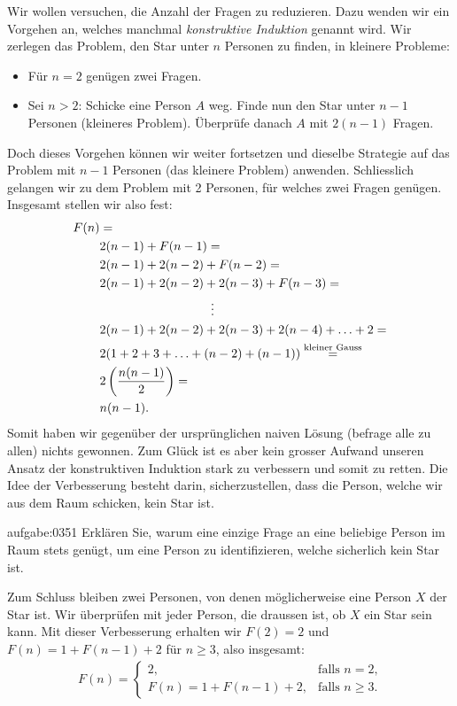 Wir wollen versuchen, die Anzahl der Fragen zu reduzieren. Dazu wenden wir ein Vorgehen an, welches manchmal \textit{konstruktive Induktion} genannt wird. Wir zerlegen das Problem, den Star unter $n$ Personen zu finden, in kleinere Probleme:
\begin{itemize}
    \item Für $n=2$ genügen zwei Fragen.
    \item Sei $n>2$: Schicke eine Person $A$ weg. Finde nun den Star unter $n-1$ Personen (kleineres Problem). Überprüfe danach $A$ mit $2(n-1)$ Fragen.
\end{itemize}
Doch dieses Vorgehen können wir weiter fortsetzen und dieselbe Strategie auf das Problem mit $n-1$ Personen (das kleinere Problem) anwenden. Schliesslich gelangen wir zu dem Problem mit 2 Personen, für welches zwei Fragen genügen. Insgesamt stellen wir also fest:
\begin{align*}
    F(n) &= \\
    &2(n-1) + F(n-1) =\\
    &2(n-1) + 2(n-2) + F(n-2) =\\
    &2(n-1) + 2(n-2) + 2(n-3) + F(n-3) =\\
    &\quad\quad\quad\quad\quad\quad\quad\quad\quad\vdots \\
    &2(n-1) + 2(n-2) + 2(n-3) + 2(n-4) + \ldots + 2 =\\
    &2(1 + 2 + 3 +\ldots + (n-2) + (n-1)) \stackrel{\text{kleiner Gauss}}{=} \\
    &2\left(\frac{n(n-1)}{2}\right) = \\
    &n(n-1).
\end{align*}
Somit haben wir gegenüber der ursprünglichen naiven Lösung (befrage alle zu allen) nichts gewonnen. Zum Glück ist es aber kein grosser Aufwand unseren Ansatz der konstruktiven Induktion stark zu verbessern und somit zu retten. Die Idee der Verbesserung besteht darin, sicherzustellen, dass die Person, welche wir aus dem Raum schicken, kein Star ist.
\begin{aufgabe}{aufgabe:0351}
Erklären Sie, warum eine einzige Frage an eine beliebige Person im Raum stets genügt, um eine Person zu identifizieren, welche sicherlich kein Star ist.
\end{aufgabe}
\noindent
Zum Schluss bleiben zwei Personen, von denen möglicherweise eine Person $X$ der Star ist. Wir überprüfen mit jeder Person, die draussen ist, ob $X$ ein Star sein kann. Mit dieser Verbesserung erhalten wir $F(2) = 2$ und $F(n) = 1 + F(n-1) + 2$ für $n\geq 3$, also insgesamt:
\begin{align}\label{eq:star}
    F(n) =
    \begin{cases}
        2, &\text{falls $n=2$,} \\
        F(n) = 1 + F(n-1) + 2, & \text{falls  $n\geq 3$.}
      \end{cases}
\end{align}
